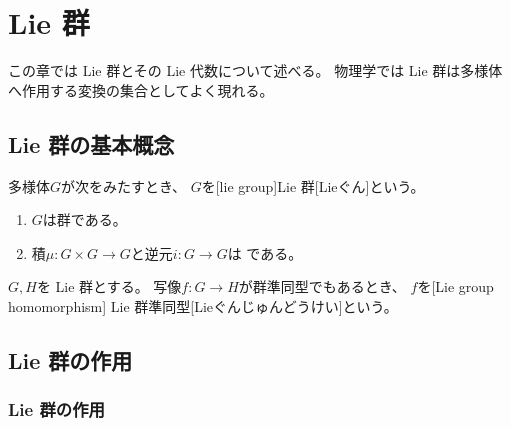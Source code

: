 \documentclass[report]{jlreq}
\begin{document}
%
\newpage
\chapter{Lie 群}

この章では Lie 群とその Lie 代数について述べる。
物理学では Lie 群は多様体へ作用する変換の集合としてよく現れる。

%
\section{Lie 群の基本概念}

\begin{definition}[Lie 群]
    多様体$G$が次をみたすとき、
    $G$を[lie group]{Lie 群}[Lieぐん]という。
    \begin{enumerate}
        \item $G$は群である。
        \item 積$\mu \colon G \times G \to G$と逆元$i \colon G \to G$は
            {\smooth}である。
    \end{enumerate}
\end{definition}

\begin{example}
    \TODO{}
\end{example}

\begin{definition}
    $G, H$を Lie 群とする。
    {\smooth}写像$f \colon G \to H$が群準同型でもあるとき、
    $f$を[Lie group homomorphism]
    {Lie 群準同型}[Lieぐんじゅんどうけい]という。
\end{definition}

\begin{example}
    \TODO{}
\end{example}

%
\section{Lie 群の作用}

\subsection{Lie 群の作用}
\end{document}

